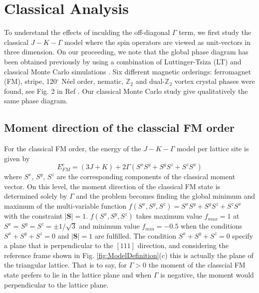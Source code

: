 \documentclass[aps,prb,reprint,amsfonts,amsmath,amssymb,showpacs,groupedaddress,superscriptaddress]{revtex4-1}
\begin{document}
\section{Classical Analysis}
To understand the effects of inculding the off-diagonal $\Gamma$ term, we first study the classical $J-K-\Gamma$ model where the spin operators are viewed as unit-vectors in three dimension. On our proceeding, we note that the global phase diagram has been obtained previously by using a combination of Luttinger-Tsiza (LT) and classical Monte Carlo simulations \cite{PhysRevB.92.165108}. Six different magnetic orderings: ferromagnet (FM), stripe, 120$^\circ$ N\'{e}el order, nematic, $\mathbb{Z}_2$ and dual-$\mathbb{Z}_2$ vortex crystal phases were found, see Fig. 2 in Ref . Our classical Monte Carlo study give qualitatively the same phase diagram.

\subsection{Moment direction of the classcial FM order}
For the classical FM order, the energy of the $J-K-\Gamma$ model per lattice site is given by
\begin{equation}
    E_{FM}^{c} = (3J + K) + 2\Gamma(S^xS^y + S^yS^z + S^zS^x)
    \label{eq:EcFM}
\end{equation}
where $S^x$, $S^y$, $S^z$ are the corresponding components of the classical moment vector. On this level, the moment direction of the classical FM state is determined solely by $\Gamma$ and the problem becomes finding the global minimum and maximum of the multi-variable function $f(S^x, S^y, S^z) = S^xS^y + S^yS^z + S^zS^x$ with the constraint $|\mathbf{S}| = 1$. $f(S^x, S^y, S^z)$ takes maximum value $f_{max}=1$ at $S^x=S^y=S^z=\pm 1/\sqrt{3}$ and minimum value $f_{min}=-0.5$ when the conditions $S^x + S^y + S^z = 0$ and $|\mathbf{S}| = 1$ are fulfilled. The condition $S^x + S^y + S^z = 0$ specify a plane that is perpendicular to the $[111]$ direction, and considering the reference frame shown in Fig. \ref{fig:ModelDefinition}(c) this is actually the plane of the triangular lattice. That is to say, for $\Gamma > 0$ the moment of the classcial FM state prefers to lie in the lattice plane and when $\Gamma$ is negative, the moment would perpendicular to the lattice plane.
\end{document}
